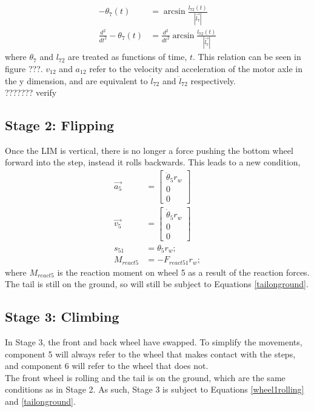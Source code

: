 \begin{subequations}
	\begin{align}
		-\theta_7(t) &= \arcsin{\frac{l_{72}(t)}{|\vec{l_7}|}}\\
		\frac{d^2}{dt^2}-\theta_7(t) &= \frac{d^2}{dt^2}\arcsin{\frac{l_{72}(t)}{|\vec{l_7}|}}
	\end{align}
\end{subequations}
where $\theta_7$ and $l_{72}$ are treated as functions of time, $t$. This relation can be seen in figure ???. $v_{12}$ and $a_{12}$ refer to the velocity and acceleration of the motor axle in the y dimension, and are equivalent to $\dot{l}_{72}$ and $\ddot{l}_{72}$ respectively.\\ ??????? verify

\subsection*{Stage 2: Flipping}

Once the LIM is vertical, there is no longer a force pushing the bottom wheel forward into the step, instead it rolls backwards. This leads to a new condition,
\begin{subequations}
	\label{wheel1rolling}
	\begin{align}
		\vec{a_5} &= \begin{bmatrix}
			\ddot{\theta}_5 r_w \\
			0\\
			0
		\end{bmatrix}\\
		\vec{v_5} &= \begin{bmatrix}
			\dot{\theta}_5 r_w \\
			0\\
			0
		\end{bmatrix}\\
		s_{51} &= \theta_{5} r_w;\\
		M_{react5} &= - F_{react51} r_w;
	\end{align}
\end{subequations}
where $M_{react5}$ is the reaction moment on wheel 5 as a result of the reaction forces.
The tail is still on the ground, so will still be subject to Equations \ref{tailonground}.

\subsection*{Stage 3: Climbing}

In Stage 3, the front and back wheel have swapped. To simplify the movements, component 5 will always refer to the wheel that makes contact with the steps, and component 6 will refer to the wheel that does not. \\
The front wheel is rolling and the tail is on the ground, which are the same conditions as in Stage 2. As such, Stage 3 is subject to Equations \ref{wheel1rolling} and \ref{tailonground}.

